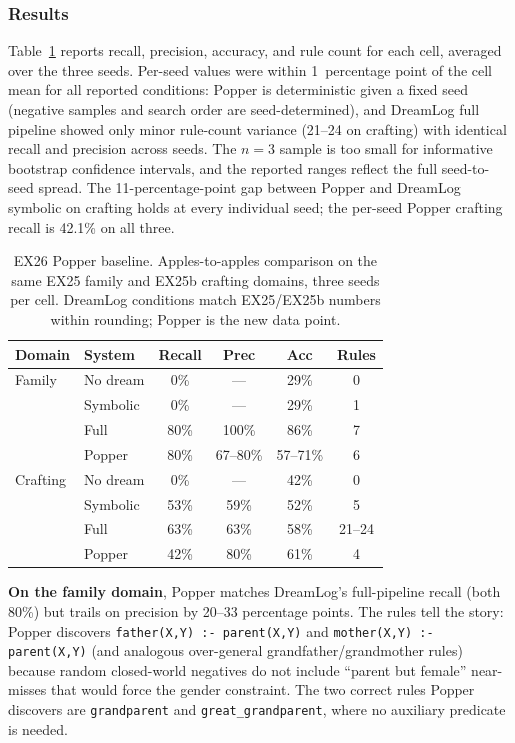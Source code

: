 \documentclass[10pt,conference]{IEEEtran}
\begin{document}
\subsubsection{Results}

Table~\ref{tab:popper_baseline} reports recall, precision, accuracy, and rule count for each cell, averaged over the three seeds. Per-seed values were within 1~percentage point of the cell mean for all reported conditions: Popper is deterministic given a fixed seed (negative samples and search order are seed-determined), and DreamLog full pipeline showed only minor rule-count variance (21--24 on crafting) with identical recall and precision across seeds. The $n=3$ sample is too small for informative bootstrap confidence intervals, and the reported ranges reflect the full seed-to-seed spread. The 11-percentage-point gap between Popper and DreamLog symbolic on crafting holds at every individual seed; the per-seed Popper crafting recall is 42.1\% on all three.

\begin{table}[t]
\centering
\caption{EX26 Popper baseline. Apples-to-apples comparison on the same EX25 family and EX25b crafting domains, three seeds per cell. DreamLog conditions match EX25/EX25b numbers within rounding; Popper is the new data point.}
\label{tab:popper_baseline}
\begin{tabular}{llcccc}
\toprule
\textbf{Domain} & \textbf{System} & \textbf{Recall} & \textbf{Prec} & \textbf{Acc} & \textbf{Rules} \\
\midrule
Family   & No dream     & 0\%   & ---    & 29\%       & 0  \\
         & Symbolic     & 0\%   & ---    & 29\%       & 1  \\
         & Full         & 80\%  & 100\%  & 86\%       & 7  \\
         & Popper       & 80\%  & 67--80\% & 57--71\% & 6  \\
\midrule
Crafting & No dream     & 0\%   & ---    & 42\%       & 0  \\
         & Symbolic     & 53\%  & 59\%   & 52\%       & 5  \\
         & Full         & 63\%  & 63\%   & 58\%       & 21--24 \\
         & Popper       & 42\%  & 80\%   & 61\%       & 4  \\
\bottomrule
\end{tabular}
\end{table}

\textbf{On the family domain}, Popper matches DreamLog's full-pipeline recall (both 80\%) but trails on precision by 20--33 percentage points. The rules tell the story: Popper discovers \texttt{father(X,Y)~:- parent(X,Y)} and \texttt{mother(X,Y)~:- parent(X,Y)} (and analogous over-general grandfather/grandmother rules) because random closed-world negatives do not include ``parent but female'' near-misses that would force the gender constraint. The two correct rules Popper discovers are \texttt{grandparent} and \texttt{great\_grandparent}, where no auxiliary predicate is needed.
\end{document}
